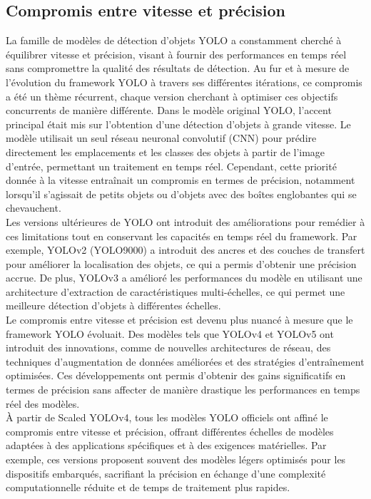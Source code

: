\documentclass{article}
\begin{document}
\subsection{Compromis entre vitesse et précision}

La famille de modèles de détection d'objets YOLO a constamment cherché à équilibrer vitesse et précision, visant à fournir des performances en temps réel sans compromettre la qualité des résultats de détection. Au fur et à mesure de l'évolution du framework YOLO à travers ses différentes itérations, ce compromis a été un thème récurrent, chaque version cherchant à optimiser ces objectifs concurrents de manière différente. Dans le modèle original YOLO, l'accent principal était mis sur l'obtention d'une détection d'objets à grande vitesse. Le modèle utilisait un seul réseau neuronal convolutif (CNN) pour prédire directement les emplacements et les classes des objets à partir de l'image d'entrée, permettant un traitement en temps réel. Cependant, cette priorité donnée à la vitesse entraînait un compromis en termes de précision, notamment lorsqu'il s'agissait de petits objets ou d'objets avec des boîtes englobantes qui se chevauchent.
\vspace{.2cm}\\
Les versions ultérieures de YOLO ont introduit des améliorations pour remédier à ces limitations tout en conservant les capacités en temps réel du framework. Par exemple, YOLOv2 (YOLO9000) a introduit des ancres et des couches de transfert pour améliorer la localisation des objets, ce qui a permis d'obtenir une précision accrue. De plus, YOLOv3 a amélioré les performances du modèle en utilisant une architecture d'extraction de caractéristiques multi-échelles, ce qui permet une meilleure détection d'objets à différentes échelles.
\vspace{.2cm}\\
Le compromis entre vitesse et précision est devenu plus nuancé à mesure que le framework YOLO évoluait. Des modèles tels que YOLOv4 et YOLOv5 ont introduit des innovations, comme de nouvelles architectures de réseau, des techniques d'augmentation de données améliorées et des stratégies d'entraînement optimisées. Ces développements ont permis d'obtenir des gains significatifs en termes de précision sans affecter de manière drastique les performances en temps réel des modèles.
\vspace{.2cm}\\
À partir de Scaled YOLOv4, tous les modèles YOLO officiels ont affiné le compromis entre vitesse et précision, offrant différentes échelles de modèles adaptées à des applications spécifiques et à des exigences matérielles. Par exemple, ces versions proposent souvent des modèles légers optimisés pour les dispositifs embarqués, sacrifiant la précision en échange d'une complexité computationnelle réduite et de temps de traitement plus rapides.
\end{document}
